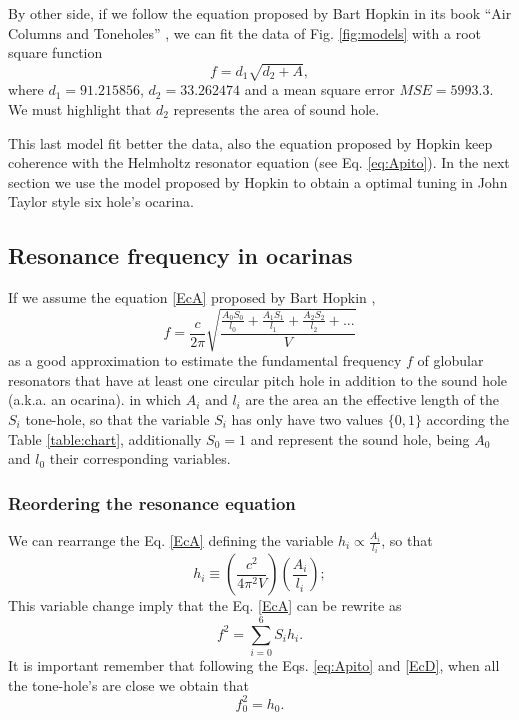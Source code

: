 \documentclass[11pt,twocolumn]{article}
\begin{document}
By other side, 
if we follow the equation proposed by Bart Hopkin in its book ``Air Columns and Toneholes'' 
\cite[pp. 44]{cabreraestudio} \cite{1999air},
we can fit the data of Fig. \ref{fig:models} with a root square function
\begin{equation}
f=d_1\sqrt{d_2+A},
\end{equation}
where $d_1=91.215856$, $d_2=33.262474$ and a mean square error $MSE=5993.3$.
We must highlight that $d_2$ represents the area of sound hole. 

This last model fit better the data, 
also the equation proposed by Hopkin keep coherence with the Helmholtz resonator equation (see Eq. \ref{eq:Apito}).
In the next section we use the model proposed by Hopkin to obtain a optimal tuning in 
John Taylor style six hole's ocarina.


\subsection{Resonance frequency in ocarinas}


If we assume the equation \ref{EcA} proposed by Bart Hopkin \cite[pp. 44]{cabreraestudio} \cite{1999air},
\begin{equation} \label{EcA}
 f = \frac{c}{2 \pi} \sqrt{\frac{\frac{A_{0}S_{0}}{l_{0}}+\frac{A_{1}S_{1}}{l_{1}}+\frac{A_{2}S_{2}}{l_{2}}+ . . .}{V} }   
\end{equation}
as a good approximation to estimate the fundamental frequency $f$ 
of globular resonators that have at least one circular pitch hole in addition to the sound hole (a.k.a. an ocarina). 
in which $A_i$ and $l_i$ are the area an the effective length of the $S_i$ tone-hole,
so that the variable $S_i$ has only have two values $\{0,1\}$ according the Table \ref{table:chart},
additionally $S_0=1$ and represent the sound hole, being $A_0$ and $l_0$ their corresponding variables. 



\subsubsection{Reordering the resonance equation}
We can rearrange the Eq. \ref{EcA} defining the variable $h_{i}\propto \frac{A_{i}}{l_{i}}$, so that
\begin{equation} \label{EcC}
 h_{i} \equiv  \left( \frac{c^2}{4 {\pi}^2 V}\right) \left( \frac{A_{i}}{l_{i}}    \right);
\end{equation}
This variable change imply that the Eq. \ref{EcA} can be rewrite as
\begin{equation} \label{EcD}
 f^{2} = \sum_{i=0}^{6}{S_i h_i}.
\end{equation}
It is important remember that following the Eqs. \ref{eq:Apito} and \ref{EcD},
when all the tone-hole's are close we obtain that 
\begin{equation} \label{EcDa}
f_0^{2} = h_0.
\end{equation} 
\end{document}
